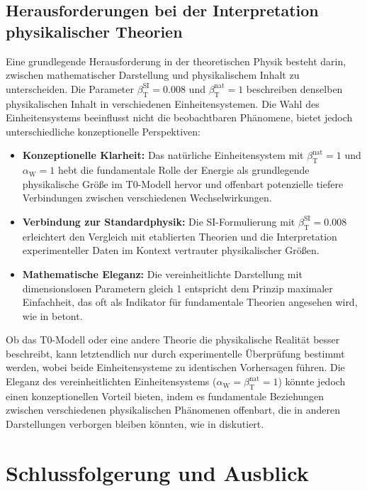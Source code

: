 \documentclass[12pt,a4paper]{article}
\newcommand{\betaT}{\beta_{\text{T}}}
\newcommand{\alphaW}{\alpha_{\text{W}}}
\begin{document}
	\subsection{Herausforderungen bei der Interpretation physikalischer Theorien}
	\label{subsec:interpretation_challenges}
	
	Eine grundlegende Herausforderung in der theoretischen Physik besteht darin, zwischen mathematischer Darstellung und physikalischem Inhalt zu unterscheiden. Die Parameter \(\betaT^{\text{SI}} = 0.008\) und \(\betaT^{\text{nat}} = 1\) beschreiben denselben physikalischen Inhalt in verschiedenen Einheitensystemen. Die Wahl des Einheitensystems beeinflusst nicht die beobachtbaren Phänomene, bietet jedoch unterschiedliche konzeptionelle Perspektiven:
	
	\begin{itemize}
		\item \textbf{Konzeptionelle Klarheit:} Das natürliche Einheitensystem mit \(\betaT^{\text{nat}} = 1\) und \(\alphaW = 1\) hebt die fundamentale Rolle der Energie als grundlegende physikalische Größe im T0-Modell hervor und offenbart potenzielle tiefere Verbindungen zwischen verschiedenen Wechselwirkungen.
		\item \textbf{Verbindung zur Standardphysik:} Die SI-Formulierung mit \(\betaT^{\text{SI}} = 0.008\) erleichtert den Vergleich mit etablierten Theorien und die Interpretation experimenteller Daten im Kontext vertrauter physikalischer Größen.
		\item \textbf{Mathematische Eleganz:} Die vereinheitlichte Darstellung mit dimensionslosen Parametern gleich 1 entspricht dem Prinzip maximaler Einfachheit, das oft als Indikator für fundamentale Theorien angesehen wird, wie in \cite{pascher_zeit_masse_2025} betont.
	\end{itemize}
	
	Ob das T0-Modell oder eine andere Theorie die physikalische Realität besser beschreibt, kann letztendlich nur durch experimentelle Überprüfung bestimmt werden, wobei beide Einheitensysteme zu identischen Vorhersagen führen. Die Eleganz des vereinheitlichten Einheitensystems (\(\alphaW = \betaT^{\text{nat}} = 1\)) könnte jedoch einen konzeptionellen Vorteil bieten, indem es fundamentale Beziehungen zwischen verschiedenen physikalischen Phänomenen offenbart, die in anderen Darstellungen verborgen bleiben könnten, wie in \cite{pascher_alphabeta_2025} diskutiert.
	
	\section{Schlussfolgerung und Ausblick}
	\label{sec:conclusion}
	
\end{document}
